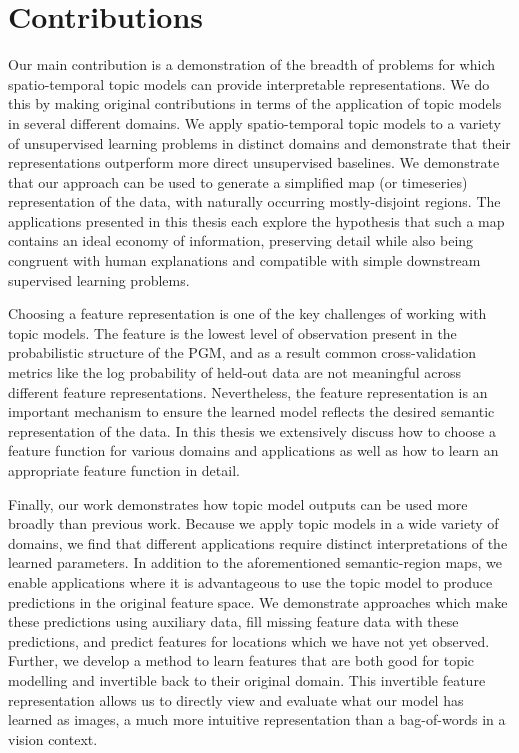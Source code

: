 \section{Contributions} \label{sec:intro-contributions}
Our main contribution is a demonstration of the breadth of problems for which spatio-temporal topic models can provide interpretable representations. We do this by making original contributions in terms of the application of topic models in several different domains. We apply spatio-temporal topic models to a variety of unsupervised learning problems in distinct domains and demonstrate that their representations outperform more direct unsupervised baselines. We demonstrate that our approach can be used to generate a simplified map (or timeseries) representation of the data, with naturally occurring mostly-disjoint regions. The applications presented in this thesis each explore the hypothesis that such a map contains an ideal economy of information, preserving detail while also being congruent with human explanations and compatible with simple downstream supervised learning problems.

Choosing a feature representation is one of the key challenges of working with topic models. The feature is the lowest level of observation present in the probabilistic structure of the PGM, and as a result common cross-validation metrics like the log probability of held-out data are not meaningful across different feature representations. Nevertheless, the feature representation is an important mechanism to ensure the learned model reflects the desired semantic representation of the data. In this thesis we extensively discuss how to choose a feature function for various domains and applications as well as how to learn an appropriate feature function in detail.

Finally, our work demonstrates how topic model outputs can be used more broadly than previous work. Because we apply topic models in a wide variety of domains, we find that different applications require distinct interpretations of the learned parameters. In addition to the aforementioned semantic-region maps, we enable applications where it is advantageous to use the topic model to produce predictions in the original feature space. We demonstrate approaches which make these predictions using auxiliary data, fill missing feature data with these predictions, and predict features for locations which we have not yet observed. Further, we develop a method to learn features that are both good for topic modelling and invertible back to their original domain. This invertible feature representation allows us to directly view and evaluate what our model has learned as images, a much more intuitive representation than a bag-of-words in a vision context.

